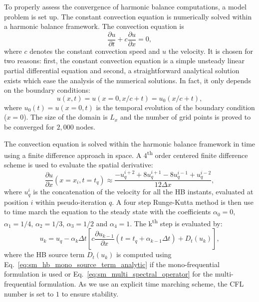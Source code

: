 
To properly assess the convergence of harmonic balance computations,
a model problem is set up. The constant convection 
equation is numerically solved within a harmonic balance 
framework. The convection equation is
\begin{equation}
  \label{eq:convection}
  \frac{\partial u}{\partial t} + c \frac{\partial u}{\partial x} = 0,
\end{equation}
where $c$ denotes the constant convection speed and $u$ the velocity. 
It is chosen for two reasons: first, the constant
convection equation is a simple unsteady 
linear partial differential equation
and second, a straightforward analytical solution
exists
which ease the analysis of the numerical solutions. In fact,
it only depends on the boundary conditions:
\begin{equation}
  \label{eq:solconvanalytic}
    u(x, t) = u(x=0, x/c + t) = u_0 (x/c + t),
\end{equation}
where $u_0(t) = u(x=0, t)$ is the temporal evolution of 
the boundary condition ($x=0$). 
The size of the domain is $L_x$ and the number of grid points is
proved to be converged for $2,000$ nodes.

The convection equation is solved within the harmonic
balance framework in time using a finite difference approach
in space.
A $4$\textsuperscript{th} order centered finite
difference scheme is used to evaluate the spatial derivative:
\begin{equation}
    \frac{\partial u}{\partial x} (x = x_i, t=t_q) \approx 
    \frac{-u^{i+2}_{q} + 8 u^{i+1}_{q} - 8 u^{i-1}_{q} + u^{i-2}_{q}}{12\Delta x},
    \label{eq:convection_center4}
\end{equation}
where $u_q^i$ is the concatenation of the velocity for  
all the HB instants,
evaluated at position $i$ within pseudo-iteration $q$.
A four step Runge-Kutta method is then use to time 
march the equation to the steady state with the coefficients $\alpha_0 = 0$,
$\alpha_1 = 1/4$, $\alpha_2 = 1/3$, $\alpha_3 = 1/2$ and $\alpha_4 = 1$.
The k\textsuperscript{th} step is evaluated by:
\begin{equation}
    u_k = u_q - \alpha_k \Delta t \left [ 
          c \frac{\partial u_{k-1}}{\partial x} (t=t_q + \alpha_{k-1} \Delta t)
          + D_t(u_k)
          \right],
    \label{eq:convection_rk4}
\end{equation}
where the HB source term $D_t(u_k)$ is computed using 
Eq.~\eqref{eq:sm_hb_mono_source_term_analytic} if the mono-frequential
formulation is used or Eq.~\eqref{eq:sm_multi_spectral_operator}
for the multi-frequential formulation.
As we use 
an explicit time marching scheme, the CFL number is set to $1$ to ensure stability.

